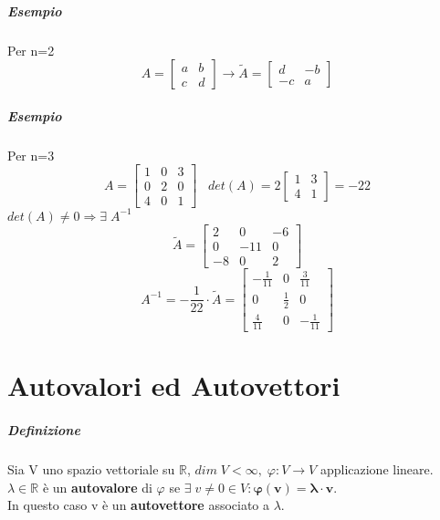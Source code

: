 \documentclass[a4paper, 12pt]{report}
\begin{document}
    \paragraph{Esempio}Per n=2
    $$
    A=
    \begin{bmatrix}
        a & b\\
        c & d    
    \end{bmatrix}
    \rightarrow
    \tilde{A}=
    \begin{bmatrix}
        d & -b\\
        -c & a
    \end{bmatrix}
    $$
    \paragraph{Esempio} Per n=3
    $$A=
    \begin{bmatrix}
        1 & 0 & 3\\
        0 & 2 & 0\\
        4 & 0 & 1
    \end{bmatrix}
    \; \; \; det(A)= 2 
    \begin{bmatrix}
        1 & 3\\
        4 & 1
    \end{bmatrix}
    =-22
    $$
    $det(A)\neq 0 \Rightarrow \exists \; A^{-1}$
    $$
    \tilde{A}=
    \begin{bmatrix}
        2 & 0 & -6\\
        0 & -11 & 0\\
        -8 & 0 & 2
    \end{bmatrix}
    $$
    $$
    A^{-1}=-\frac{1}{22} \cdot \tilde{A}=
    \begin{bmatrix}
        -\frac{1}{11} & 0 & \frac{3}{11}\\
        0 & \frac{1}{2} & 0\\
        \frac{4}{11} & 0 & -\frac{1}{11}
    \end{bmatrix}
    $$
    \chapter{Autovalori ed Autovettori}
        \paragraph{Definizione} Sia V uno spazio vettoriale su $\mathbb{R}$, $dim \; V < \infty,\; \varphi: V \rightarrow V$ applicazione lineare.\\
        $\lambda \in \mathbb{R}$ è un \textbf{autovalore} di $\varphi$ se $\exists \; v \neq 0 \in V: \boldsymbol{\varphi(v)=\lambda \cdot v}$.\\
        In questo caso v è un \textbf{autovettore} associato a $\lambda$.
\end{document}
